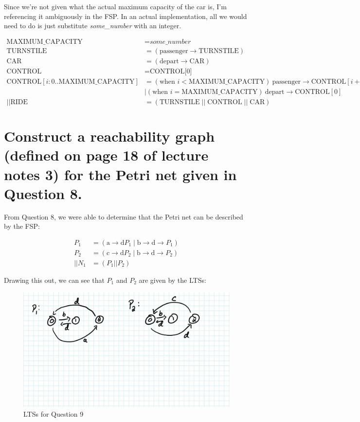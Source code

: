 \documentclass{article}[8pt]
\begin{document}
Since we're not given what the actual maximum capacity of the car is, I'm referencing it ambiguously in the FSP. In an actual implementation, all we would need to do is just substitute \emph{some\_number} with an integer.

\begin{align*}
\text{MAXIMUM\_CAPACITY} &= \textit{some\_number} \\
\text{TURNSTILE} &= (\text{passenger} \rightarrow \text{TURNSTILE}) \\
\text{CAR} &= (\text{depart} \rightarrow \text{CAR}) \\
\text{CONTROL} &= \text{CONTROL[0]} \\
\text{CONTROL}[i:0..\text{MAXIMUM\_CAPACITY}] &= 
  (\text{when } i < \text{MAXIMUM\_CAPACITY}) \ \text{passenger} \rightarrow \text{CONTROL}[i+1] \\
&\mid (\text{when } i = \text{MAXIMUM\_CAPACITY}) \ \text{depart} \rightarrow \text{CONTROL}[0] \\
||\text{RIDE} &= (\text{TURNSTILE} \;||\; \text{CONTROL} \;||\; \text{CAR})
\end{align*}

\section[Question ~\thesection]{Construct a reachability graph (defined on page 18 of lecture notes 3) for the Petri net given in Question 8.}

From Question 8, we were able to determine that the Petri net can be described by the FSP:

\begin{align*}
	P_1 &= (\text{a} \rightarrow \text{d} P_1 \; | \; \text{b} \rightarrow \text{d} \rightarrow P_1) \\
	P_2 &= (\text{c} \rightarrow \text{d} P_2 \; | \; \text{b} \rightarrow \text{d} \rightarrow P_2) \\
	||N_1 &= (P_1||P_2)
\end{align*}

Drawing this out, we can see that $P_1$ and $P_2$ are given by the LTSs:

\begin{figure}[H]
	\includegraphics[width=\linewidth]{./imgs/Question-9-LTSs.png}
	\caption{LTSs for Question 9}
	\label{fig:Question-9}
\end{figure}
\end{document}
